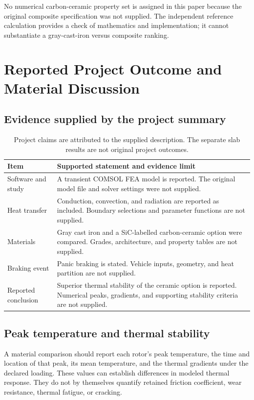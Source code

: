 \documentclass[11pt,a4paper]{article}
\newcommand{\sectionpage}[1]{\clearpage\section{#1}}
\begin{document}
No numerical carbon-ceramic property set is assigned in this paper because the original composite specification was not supplied. The independent reference calculation provides a check of mathematics and implementation; it cannot substantiate a gray-cast-iron versus composite ranking.

\sectionpage{Reported Project Outcome and Material Discussion}
\subsection{Evidence supplied by the project summary}
\begin{table}[h!]\centering\small
\begin{tabularx}{\textwidth}{@{}lX@{}}\toprule
Item & Supported statement and evidence limit\\\midrule
Software and study & A transient COMSOL FEA model is reported. The original model file and solver settings were not supplied.\\
Heat transfer & Conduction, convection, and radiation are reported as included. Boundary selections and parameter functions are not supplied.\\
Materials & Gray cast iron and a SiC-labelled carbon-ceramic option were compared. Grades, architecture, and property tables are not supplied.\\
Braking event & Panic braking is stated. Vehicle inputs, geometry, and heat partition are not supplied.\\
Reported conclusion & Superior thermal stability of the ceramic option is reported. Numerical peaks, gradients, and supporting stability criteria are not supplied.\\\bottomrule
\end{tabularx}
\caption{Project claims are attributed to the supplied description. The separate slab results are not original project outcomes.}
\end{table}

\subsection{Peak temperature and thermal stability}
A material comparison should report each rotor's peak temperature, the time and location of that peak, its mean temperature, and the thermal gradients under the declared loading. These values can establish differences in modeled thermal response. They do not by themselves quantify retained friction coefficient, wear resistance, thermal fatigue, or cracking.
\end{document}
